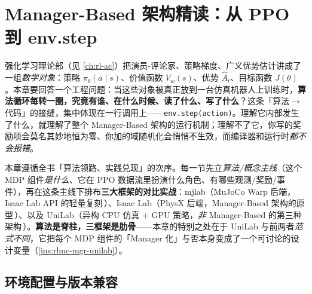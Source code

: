 \chapter{Manager-Based 架构精读：从 PPO 到 env.step}\label{ch:rlmc-manager}


强化学习理论部（见 \cref{ch:rl-ac}）把演员-评论家、策略梯度、广义优势估计讲成了一组\emph{数学对象}：策略 $\pi_\theta(a\mid s)$、价值函数 $V_w(s)$、优势 $\hat A_t$、目标函数 $J(\theta)$。本章要回答一个工程问题：当这些对象被真正放到一台仿真机器人上训练时，\textbf{算法循环每转一圈，究竟有谁、在什么时候、读了什么、写了什么}？这条「算法$\to$代码」的接缝，集中体现在一行调用上——\verb|env.step(action)|。理解它内部发生了什么，就理解了整个 Manager-Based 架构的运行机制；理解不了它，你写的奖励项会莫名其妙地恒为零、你加的域随机化会悄悄不生效，而编译器和运行时\emph{都不会报错}。

本章遵循全书「算法领路、实践兑现」的次序。每一节先立\emph{算法/概念主线}（这个 MDP 组件\emph{是什么}、它在 PPO 数据流里扮演什么角色、有哪些观测/奖励/事件），再在这条主线下排布\textbf{三大框架的对比实战}：mjlab（MuJoCo Warp 后端，Isaac Lab API 的轻量复刻\,\cite{mjlab2026}）、Isaac Lab（PhysX 后端，Manager-Based 架构的原型\,\cite{isaaclab2024}）、以及 UniLab（异构 CPU 仿真 + GPU 策略，\emph{非} Manager-Based 的第三种架构\,\cite{unilab2026}）。\textbf{算法是脊柱，三框架是肋骨}——本章的特别之处在于 UniLab 与前两者\emph{范式不同}，它把每个 MDP 组件的「Manager 化」与否本身变成了一个可讨论的设计变量（\cref{ins:rlmc-mgr-unilab}）。

\section*{环境配置与版本兼容}
\label{sec:rlmc-mgr-env}

